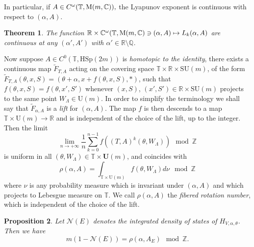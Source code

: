 \documentclass[11pt]{amsart}
\newtheorem{theorem}{Theorem}[section]
\newtheorem{proposition}[theorem]{Proposition}
\theoremstyle{remark}
\theoremstyle{definition}
\newcommand{\C}{{\mathbf C}}
\newcommand{\Q}{{\mathbf Q}}
\newcommand{\R}{{\mathbf R}}
\newcommand{\T}{{\mathbf T}}
\newcommand{\Z}{{\mathbf Z}}
\def \C{{\mathcal{C}}}
\def \Z{\mathcal{Z}}
\def\Z{{\mathbb Z}}
\def\C{{\mathbb C}}
\def\R{{\mathbb R}}
\def\Q{{\mathbb Q}}
\def\T{{\mathbb T}}
\begin{document}
In particular, if $A\in C^\omega(\T,{\rm M}(m,\C)),$ the Lyapunov exponent is  continuous with respect to $(\alpha,A).$
\begin{theorem}\cite{AJS}\label{Lecon}
	The function $\R \times \C^{\omega}(\T, {\rm M}(m,\C)\ni
	(\alpha,A)\mapsto L_k(\alpha,A)$
	are continuous at any $(\alpha',A')$ with $\alpha'\in \R\setminus\Q$.
\end{theorem}



 
Now suppose $ A\in C^0(\T,\mathrm{HSp}(2m)) $ is {\it homotopic to the identity}, there exists a continuous map $ \tilde{F}_{T,A}$ acting on the covering space $\T\times \R\times \mathrm{SU}(m)  $, of the form $ \tilde{F}_{T,A}(\theta,x,S)=(\theta+\alpha,x+f(\theta,x,S),*) $, such that $ f(\theta,x,S)=f(\theta,x',S') $ whenever $ (x,S) $, $ (x',S')\in \R\times \mathrm{SU}(m) $ projects to the same point $ W_{\Lambda}\in \mathrm{U}(m) $. In order to simplify the terminology we shall say that $  \tilde{F}_{\alpha,A} $ is a {\it lift} for $ (\alpha,A) $. The map $ f $ is then descends to a map $ \T\times \mathrm{U}(m) \to \R $ and is independent of the choice of the lift, up to the integer.
   Then the limit 
  \[
	\lim_{n\to +\infty}\frac{1}{n}\sum_{k=0}^{n-1} f\left({(T,A)^k(\theta,W_{\Lambda})}\right) \mod \Z
  \] 
 is uniform in all $ (\theta,W_{\Lambda})\in \T\times\mathbf{U}(m) $, and coincides with 
  \[
	\rho(\alpha,A)=\int_{\T\times \mathrm{U}(m)} f(\theta,W_{\Lambda})d\nu \mod \Z
  \] 
  where $ \nu $ is any probability measure which is invariant under $ (\alpha,A) $ and which projects to Lebesgue measure on $ \T$. We call  $ \rho(\alpha,A) $ the {\it fibered rotation number}, which is independent of the choice of the lift.

  \begin{proposition}\cite{LW}\label{rotids}
	Let $ \mathcal{N}(E) $ denotes the {\it integrated density of states} of $ H_{V,\alpha,\theta} $. Then we have
	\[
		m(1-\mathcal{N}(E))=\rho(\alpha,A_E) \mod \Z.
	\] 
  \end{proposition}
	
\end{document}
